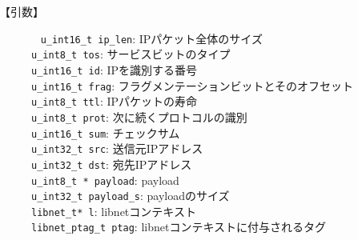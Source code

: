 \documentclass[12pt]{jsarticle}
\begin{document}
\begin{enumerate}
\begin{description}
            \item[【引数】]~\newline
                {\tt u\_int16\_t ip\_len}: IPパケット全体のサイズ\\
                {\tt u\_int8\_t tos}: サービスビットのタイプ\\
                {\tt u\_int16\_t id}: IPを識別する番号\\
                {\tt u\_int16\_t frag}: フラグメンテーションビットとそのオフセット\\
                {\tt u\_int8\_t ttl}: IPパケットの寿命\\
                {\tt u\_int8\_t prot}: 次に続くプロトコルの識別\\
                {\tt u\_int16\_t sum}: チェックサム\\
                {\tt u\_int32\_t src}: 送信元IPアドレス\\
                {\tt u\_int32\_t dst}: 宛先IPアドレス\\
                {\tt u\_int8\_t * payload}: payload\\
                {\tt u\_int32\_t payload\_s}: payloadのサイズ\\
                {\tt libnet\_t* l}: libnetコンテキスト\\
                {\tt libnet\_ptag\_t ptag}: libnetコンテキストに付与されるタグ\\


\end{description}
\end{enumerate}
\end{document}

